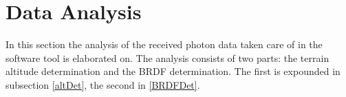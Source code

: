 \section{Data Analysis}
\label{dataAnalysis}
In this section the analysis of the received photon data taken care of in the software tool is elaborated on. The analysis consists of two parts: the terrain altitude determination and the \ac{BRDF} determination. The first is expounded in subsection \ref{altDet}, the second in \ref{BRDFDet}.